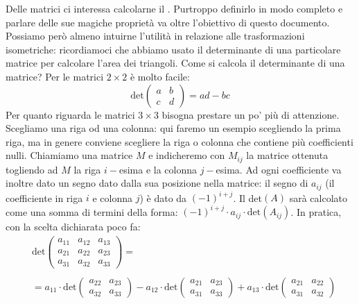 \documentclass[a4paper, oneside]{article}
\begin{document}
		Delle matrici ci interessa calcolarne il . Purtroppo definirlo in modo completo e parlare delle sue magiche proprietà va oltre l'obiettivo di questo documento. Possiamo però almeno intuirne l'utilità in relazione alle trasformazioni isometriche: ricordiamoci che abbiamo usato il determinante di una particolare matrice per calcolare l'area dei triangoli.
		Come si calcola il determinante di una matrice? Per le matrici $2\times 2$ è molto facile:
		\begin{equation*}
			\mathrm{det}\left(
			\begin{array}{cc}
				a & b \\
				c & d
			\end{array} \right) = ad - bc
		\end{equation*}
		Per quanto riguarda le matrici $3\times 3$ bisogna prestare un po' più di attenzione. Scegliamo una riga od una colonna: qui faremo un esempio scegliendo la prima riga, ma in genere conviene scegliere la riga o colonna che contiene più coefficienti nulli. Chiamiamo una matrice $M$ e indicheremo con $M_{ij}$ la matrice ottenuta togliendo ad $M$ la riga $i-$esima e la colonna $j-$esima. Ad ogni coefficiente va inoltre dato un segno dato dalla sua posizione nella matrice: il segno di $a_{ij}$ (il coefficiente in riga $i$ e colonna $j$) è dato da $(-1)^{i+j}$. Il det$(A)$ sarà calcolato come una somma di termini della forma: $\displaystyle (-1)^{i+j}\cdot a_{ij} \cdot\mathrm{det}(A_{ij})$. In pratica, con la scelta dichiarata poco fa:
		\begin{eqnarray*}
			& \mathrm{det}\left(
			\begin{array}{ccc}
				a_{11} & a_{12} & a_{13} \\
				a_{21} & a_{22} & a_{23} \\
				a_{31} & a_{32} & a_{33}
			\end{array} \right) = 
		\\ & \\ & = a_{11}\cdot \mathrm{det}\left(
		\begin{array}{cc} 
			a_{22} & a_{23} \\ 
			a_{32} & a_{33} 
		\end{array} \right) - a_{12}\cdot \mathrm{det}\left(
		\begin{array}{cc} 
			a_{21} & a_{23} \\ 
			a_{31} & a_{33} 
		\end{array} \right) + a_{13}\cdot \mathrm{det}\left(
		\begin{array}{cc} 
			a_{21} & a_{22} \\ 
			a_{31} & a_{32} 
		\end{array} \right)
		\end{eqnarray*}
\end{document}
